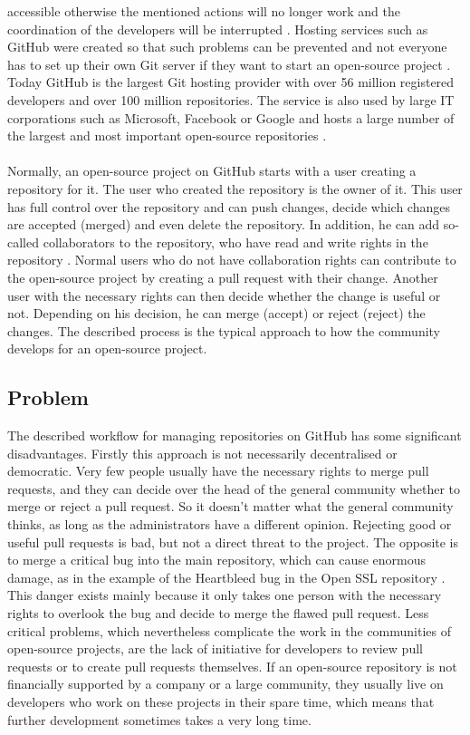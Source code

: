 \documentclass[sigconf]{acmart}
\begin{document}
accessible otherwise the mentioned actions will no longer work and the coordination of the developers will be
interrupted \cite{ulrich2020dev}. Hosting services such as GitHub were created so that such problems can be prevented 
and not everyone has to set up their own Git server if they want to start an open-source project \cite{ulrich2020dev, git2021hub}.
Today GitHub is the largest Git hosting provider with over 56 million registered developers and over 100 million repositories.
\cite{git2021hub} The service is also used by large IT corporations such as Microsoft, Facebook or Google and hosts a large 
number of the largest and most important open-source repositories \cite{git2021stars}.\\ \\
Normally, an open-source project on GitHub starts with a user creating a repository for it. The user who created the 
repository is the owner of it. This user has full control over the repository and can push changes, decide which changes are 
accepted (merged) and even delete the repository. In addition, he can add so-called collaborators to the repository, who have 
read and write rights in the repository \cite{git2021rights}. Normal users who do not have collaboration rights can contribute to 
the open-source project by creating a pull request with their change. Another user with the necessary rights can then decide 
whether the change is useful or not. Depending on his decision, he can merge (accept) or reject (reject) the changes. 
The described process is the typical approach to how the community develops for an open-source project.


\subsection{Problem}
The described workflow for managing repositories on GitHub has some significant disadvantages. 
Firstly this approach is not necessarily decentralised or democratic. Very few people usually have 
the necessary rights to merge pull requests, and they can decide over the head of the general community whether to merge or reject
 a pull request. So it doesn't matter what the general community thinks, as long as the administrators have a different opinion. Rejecting
 good or useful pull requests is bad, but not a direct threat to the project. The opposite is to merge a critical bug into the main repository,
 which can cause enormous damage, as in the example of the Heartbleed bug in the Open SSL repository \cite{ioriheartbleed}. This 
danger exists mainly because it only takes one person with the necessary rights to overlook the bug and decide to merge the flawed 
pull request. Less critical problems, which nevertheless complicate the work in the communities of open-source projects, are the lack
 of initiative for developers to review pull requests or to create pull requests themselves. If an open-source repository is not financially
 supported by a company or a large community, they usually live on developers who work on these projects in their spare time, which 
means that further development sometimes takes a very long time. 
\end{document}
